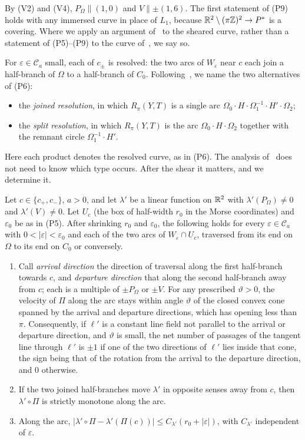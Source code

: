 By (V2) and (V4), $P_\Omega\parallel(1,0)$ and $V\parallel\pm(1,6)$. The first statement of (P9) holds with any immersed
curve in place of $L_1$, because $\mathbb{R}^2\setminus(\pi\mathbb{Z})^2\to P^{*}$ is a covering. Where we apply an argument
of~\cite{WuebbenV} to the sheared curve, rather than a statement of (P5)--(P9) to the curve of~\cite{WuebbenV}, we say so.

For $\varepsilon\in\mathcal C_a$ small, each of $c_\pm$ is resolved: the two arcs of $W_\varepsilon$ near $c$ each join a
half-branch of $\Omega$ to a half-branch of $C_0$. Following~\cite[\S6.1]{WuebbenV}, we name the two alternatives of (P6):
\begin{itemize}
\item the \emph{joined resolution}, in which $R_\pi(Y,T)$ is a single arc $\Omega_0\cdot H\cdot \Omega_1^{-1}\cdot H'\cdot \Omega_2$;
\item the \emph{split resolution}, in which $R_\pi(Y,T)$ is the arc $\Omega_0\cdot H\cdot \Omega_2$ together with the remnant
circle $\Omega_1^{-1}\cdot H'$.
\end{itemize}
Here each product denotes the resolved curve, as in (P6). The analysis of~\cite{WuebbenV} does not need to know which
type occurs. After the shear it matters, and we determine it.

\begin{lemma}\label{lem:resolvedlambda}
Let $c\in\{c_+,c_-\}$, $a>0$, and let $\lambda'$ be a linear function on $\mathbb{R}^2$ with $\lambda'(P_\Omega)\neq0$ and $\lambda'(V)\neq0$. Let
$U_c$ (the box of half-width $r_0$ in the Morse coordinates) and $\varepsilon_0$ be as in (P5). After shrinking $r_0$ and $\varepsilon_0$, the following
holds for every $\varepsilon\in\mathcal C_a$ with $0<|\varepsilon|<\varepsilon_0$ and each of the two arcs of $W_\varepsilon\cap U_c$, traversed from its
end on $\Omega$ to its end on $C_0$ or conversely.
\begin{enumerate}
\item Call \emph{arrival direction} the direction of traversal along the first half-branch towards $c$, and
\emph{departure direction} that along the second half-branch away from $c$; each is a multiple of $\pm P_\Omega$ or $\pm V$.
For any prescribed $\vartheta>0$, the velocity of $\Pi$ along the arc stays within angle $\vartheta$ of the closed convex cone
spanned by the arrival and departure directions, which has opening less than $\pi$. Consequently, if $\ell'$ is a constant line field not parallel to the arrival or departure
direction, and $\vartheta$ is small, the net number of passages of the tangent line through $\ell'$ is $\pm1$ if one of the two
directions of $\ell'$ lies inside that cone, the sign being that of the rotation from the arrival to the departure
direction, and $0$ otherwise.
\item If the two joined half-branches move $\lambda'$ in opposite senses away from $c$, then $\lambda'\circ\Pi$ is strictly monotone
along the arc.
\item Along the arc, $|\lambda'\circ\Pi-\lambda'(\Pi(c))|\le C_{\lambda'}(r_0+|\varepsilon|)$, with $C_{\lambda'}$ independent of $\varepsilon$.
\end{enumerate}
\end{lemma}

